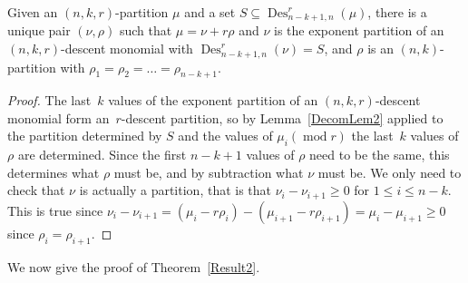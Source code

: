\documentclass[ALCO,ThmDefs,Unicode,epreuves]{cedram}
\DeclareMathOperator{\modrm}{mod}
\DeclareMathOperator{\Des}{Des}
\begin{document}
\begin{lemm}

\label{Decom2Lem2}

Given an $(n,k,r)$-partition $\mu$ and a set $S\subseteq \Des ^r_{n-k+1,n}(\mu)$, there is a unique pair $(\nu,\rho)$ such that 
$\mu=\nu+r\rho$ and $\nu$ is the exponent partition of an $(n,k,r)$-descent monomial with $\Des ^r_{n-k+1,n}(\nu)=S$, and $\rho$ 
is an $(n,k)$-partition with $\rho_1=\rho_2=\ldots =\rho_{n-k+1}$.

	\begin{proof}

		The last~$k$ values of the exponent partition of an $(n,k,r)$-descent monomial form an~$r$-descent partition, so by 
Lemma~\ref{DecomLem2} applied to the partition determined by $S$ and the values of $\mu_i (\modrm r)$ the last~$k$ values of $\rho$ are determined. Since the first $n-k+1$ values of $\rho$ need to be the same, this determines 
what $\rho$ must be, and by subtraction what $\nu$ must be. We only need to check that $\nu$ is actually a partition, 
that is that $\nu_i-\nu_{i+1}\geq 0$ for $1\leq i\leq n-k$. This is true since 
$\nu_i-\nu_{i+1}=(\mu_{i}-r\rho_i)-(\mu_{i+1}-r\rho_{i+1})=\mu_i-\mu_{i+1}\geq 0$ since $\rho_i=\rho_{i+1}$.
	\end{proof}

\end{lemm}

We now give the proof of Theorem~\ref{Result2}.
\end{document}
